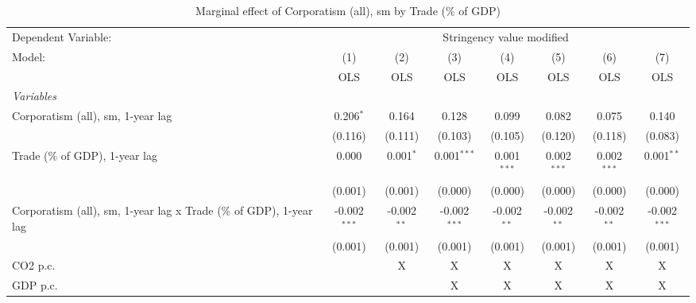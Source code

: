 
\begin{table}[htbp]
   \caption{Marginal effect of Corporatism (all), sm by Trade (\% of GDP)}
   \centering
   \begin{tabular}{lccccccc}
      \toprule
      Dependent Variable: & \multicolumn{7}{c}{Stringency value modified}\\
      Model:                                                             & (1)            & (2)           & (3)            & (4)           & (5)           & (6)           & (7)\\  
                                                                         &  OLS           & OLS           & OLS            & OLS           & OLS           & OLS           & OLS\\  
      \midrule
      \emph{Variables}\\
      Corporatism (all), sm, 1-year lag                                  & 0.206$^{*}$    & 0.164         & 0.128          & 0.099         & 0.082         & 0.075         & 0.140\\   
                                                                         & (0.116)        & (0.111)       & (0.103)        & (0.105)       & (0.120)       & (0.118)       & (0.083)\\   
      Trade (\% of GDP), 1-year lag                                      & 0.000          & 0.001$^{*}$   & 0.001$^{***}$  & 0.001$^{***}$ & 0.002$^{***}$ & 0.002$^{***}$ & 0.001$^{**}$\\   
                                                                         & (0.001)        & (0.001)       & (0.000)        & (0.000)       & (0.000)       & (0.000)       & (0.000)\\   
      Corporatism (all), sm, 1-year lag x Trade (\% of GDP), 1-year lag  & -0.002$^{***}$ & -0.002$^{**}$ & -0.002$^{***}$ & -0.002$^{**}$ & -0.002$^{**}$ & -0.002$^{**}$ & -0.002$^{***}$\\   
                                                                         & (0.001)        & (0.001)       & (0.001)        & (0.001)       & (0.001)       & (0.001)       & (0.001)\\   
      CO2 p.c.                                                           &                & X             & X              & X             & X             & X             & X\\  
      GDP p.c.                                                           &                &               & X              & X             & X             & X             & X\\  

\end{tabular}
\end{table}
